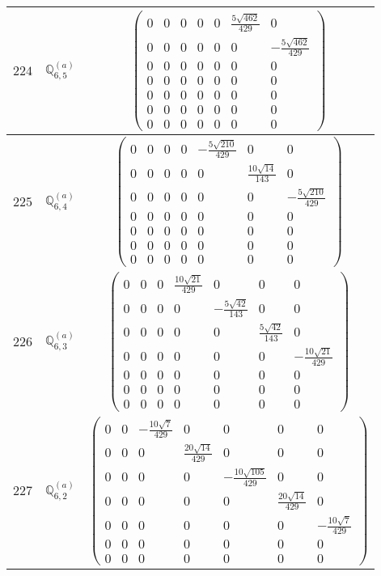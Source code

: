 \documentclass[fleqn,8pt,landscape]{jsarticle}
\begin{document}
\begin{center}
\begin{longtable}{ccc}
$ 224 $ & $ \mathbb{Q}_{6,5}^{(a)} $ & $ \begin{pmatrix} 0 & 0 & 0 & 0 & 0 & \frac{5 \sqrt{462}}{429} & 0 \\ 0 & 0 & 0 & 0 & 0 & 0 & - \frac{5 \sqrt{462}}{429} \\ 0 & 0 & 0 & 0 & 0 & 0 & 0 \\ 0 & 0 & 0 & 0 & 0 & 0 & 0 \\ 0 & 0 & 0 & 0 & 0 & 0 & 0 \\ 0 & 0 & 0 & 0 & 0 & 0 & 0 \\ 0 & 0 & 0 & 0 & 0 & 0 & 0 \end{pmatrix} $ \\ \hline
$ 225 $ & $ \mathbb{Q}_{6,4}^{(a)} $ & $ \begin{pmatrix} 0 & 0 & 0 & 0 & - \frac{5 \sqrt{210}}{429} & 0 & 0 \\ 0 & 0 & 0 & 0 & 0 & \frac{10 \sqrt{14}}{143} & 0 \\ 0 & 0 & 0 & 0 & 0 & 0 & - \frac{5 \sqrt{210}}{429} \\ 0 & 0 & 0 & 0 & 0 & 0 & 0 \\ 0 & 0 & 0 & 0 & 0 & 0 & 0 \\ 0 & 0 & 0 & 0 & 0 & 0 & 0 \\ 0 & 0 & 0 & 0 & 0 & 0 & 0 \end{pmatrix} $ \\ \hline
$ 226 $ & $ \mathbb{Q}_{6,3}^{(a)} $ & $ \begin{pmatrix} 0 & 0 & 0 & \frac{10 \sqrt{21}}{429} & 0 & 0 & 0 \\ 0 & 0 & 0 & 0 & - \frac{5 \sqrt{42}}{143} & 0 & 0 \\ 0 & 0 & 0 & 0 & 0 & \frac{5 \sqrt{42}}{143} & 0 \\ 0 & 0 & 0 & 0 & 0 & 0 & - \frac{10 \sqrt{21}}{429} \\ 0 & 0 & 0 & 0 & 0 & 0 & 0 \\ 0 & 0 & 0 & 0 & 0 & 0 & 0 \\ 0 & 0 & 0 & 0 & 0 & 0 & 0 \end{pmatrix} $ \\ \hline
$ 227 $ & $ \mathbb{Q}_{6,2}^{(a)} $ & $ \begin{pmatrix} 0 & 0 & - \frac{10 \sqrt{7}}{429} & 0 & 0 & 0 & 0 \\ 0 & 0 & 0 & \frac{20 \sqrt{14}}{429} & 0 & 0 & 0 \\ 0 & 0 & 0 & 0 & - \frac{10 \sqrt{105}}{429} & 0 & 0 \\ 0 & 0 & 0 & 0 & 0 & \frac{20 \sqrt{14}}{429} & 0 \\ 0 & 0 & 0 & 0 & 0 & 0 & - \frac{10 \sqrt{7}}{429} \\ 0 & 0 & 0 & 0 & 0 & 0 & 0 \\ 0 & 0 & 0 & 0 & 0 & 0 & 0 \end{pmatrix} $ \\ \hline

\end{longtable}
\end{center}
\end{document}
